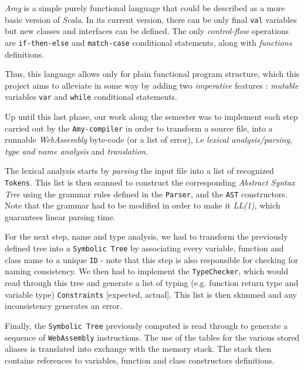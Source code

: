 \textsl{Amy} is a simple purely functional language that could be described as a more basic version of \textsl{Scala}. In its current version, there can be only final \texttt{val} variables but new classes and interfaces can be defined. The only \textit{control-flow} operations are \texttt{if-then-else} and \texttt{match-case} conditional statements, along with \textit{functions} definitions.

Thus, this language allows only for plain functional program structure, which this project aims to alleviate in some way by adding two \textit{imperative} features : \textit{mutable} variables \texttt{var} and \texttt{while} conditional statements.

Up until this last phase, our work along the semester was to implement each step carried out by the \texttt{Amy-compiler} in order to transform a source file, into a runnable \textit{WebAssembly} byte-code (or a list of error), i.e \textsl{lexical analysis/parsing}, \textsl{type and name analysis} and \textsl{translation}.

The lexical analysis starts by \textit{parsing} the input file into a list of recognized \texttt{Tokens}. This list is then scanned to construct the corresponding \textit{Abstract Syntax Tree} using the grammar rules defined in the \texttt{Parser}, and the \texttt{AST} constructors. Note that the grammar had to be modified in order to make it \textsl{LL(1)}, which guarantees linear parsing time.

For the next step, name and type analysis, we had to transform the previously defined tree into a \texttt{Symbolic Tree} by associating every variable, function and class name to a unique \texttt{ID} - note that this step is also responsible for checking for naming consistency. We then had to implement the \texttt{TypeChecker}, which would read through this tree and generate a list of typing (e.g. function return type and variable type)   \texttt{Constraints} [expected, actual]. This list is then skimmed and any inconsistency generates an error.

Finally, the \texttt{Symbolic Tree} previously computed is read through to generate a sequence of \texttt{WebAssembly} instructions. The use of the tables for the various stored aliases is translated into exchange with the memory stack. The stack then contains references to variables, function and class constructors definitions.